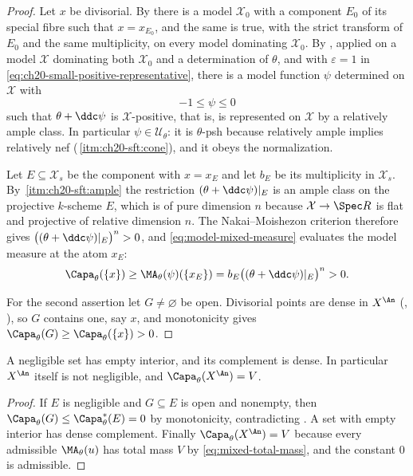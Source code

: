 \begin{proof}
Let $x$ be divisorial.  By  there is
a model $\mathcal X_0$ with a component $E_0$ of its special fibre such
that $x=x_{E_0}$, and the same is true, with the strict transform of
$E_0$ and the same multiplicity, on every model dominating
$\mathcal X_0$.  By , applied on a
model $\mathcal X$ dominating both $\mathcal X_0$ and a determination of
$\theta$, and with $\varepsilon=1$ in
\eqref{eq:ch20-small-positive-representative}, there is a model function
$\psi$ determined on $\mathcal X$ with
\[
                       -1\leq\psi\leq0
\]
such that $\theta+\ddc\psi$ is $\mathcal X$-positive, that is, is
represented on $\mathcal X$ by a relatively ample class.  In particular
$\psi\in\mathcal U_\theta$: it is $\theta$-psh because relatively ample
implies relatively nef
(\,\cref{itm:ch20-sft:cone}), and it obeys
the normalization.

Let $E\subseteq\mathcal X_s$ be the component with $x=x_E$ and let
$b_E$ be its multiplicity in $\mathcal X_s$.  By
\,\cref{itm:ch20-sft:ample} the restriction
$(\theta+\ddc\psi)|_E$ is an ample class on the projective $k$-scheme
$E$, which is of pure dimension $n$ because
$\mathcal X\to\Spec R$ is flat and projective of relative dimension $n$.
The Nakai--Moishezon criterion therefore gives
$\bigl((\theta+\ddc\psi)|_E\bigr)^n>0$, and
\eqref{eq:model-mixed-measure} evaluates the model measure at the atom
$x_E$:
\begin{equation}
\label{eq:ch25-divisorial-atom}
 \Capa_\theta(\{x\})\geq\MA_\theta(\psi)(\{x_E\})
 =b_E\bigl((\theta+\ddc\psi)|_E\bigr)^n>0 .
\end{equation}

For the second assertion let $G\neq\varnothing$ be open.  Divisorial points
are dense in $X^{\An}$
(, ),
so $G$ contains one, say $x$, and monotonicity gives
$\Capa_\theta(G)\geq\Capa_\theta(\{x\})>0$.
\end{proof}

\begin{corollary}
\label{cor:ch25-negligible-empty-interior}
A negligible set has empty interior, and its complement is dense.  In
particular $X^{\An}$ itself is not negligible, and
$\Capa_\theta(X^{\An})=V$.
\end{corollary}

\begin{proof}
If $E$ is negligible and $G\subseteq E$ is open and nonempty, then
$\Capa_\theta(G)\leq\Capa_\theta^*(E)=0$ by monotonicity, contradicting
.  A set with empty interior has dense
complement.  Finally $\Capa_\theta(X^{\An})=V$ because every admissible
$\MA_\theta(u)$ has total mass $V$ by
\eqref{eq:mixed-total-mass}, and the constant $0$ is admissible.
\end{proof}

